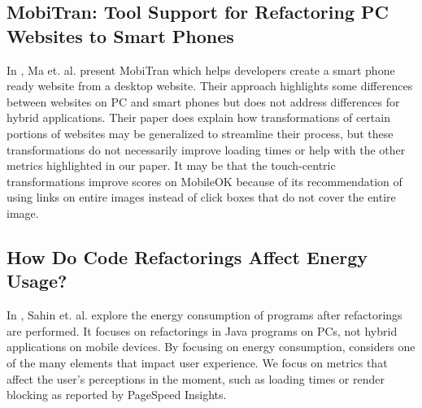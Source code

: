 \documentclass{acm_proc_article-sp}
\begin{document}
\subsection{MobiTran: Tool Support for Refactoring PC Websites to Smart Phones \cite{Ma:2013:MTS:2541614.2541621}}
In \cite{Ma:2013:MTS:2541614.2541621}, Ma et. al. present MobiTran which helps developers create a smart phone ready website from a desktop website. 
Their approach highlights some differences between websites on PC and smart phones but does not address differences for hybrid applications. 
Their paper does explain how transformations of certain portions of websites may be generalized to streamline their process, but these transformations do not necessarily improve loading times or help with the other metrics highlighted in our paper. 
It may be that the touch-centric transformations improve scores on MobileOK because of its recommendation of using links on entire images instead of click boxes that do not cover the entire image.

\subsection{How Do Code Refactorings Affect Energy Usage? \cite{Sahin:2014:CRA:2652524.2652538}}
In \cite{Sahin:2014:CRA:2652524.2652538}, Sahin et. al. explore the energy consumption of programs after refactorings are performed. 
It focuses on refactorings in Java programs on PCs, not hybrid applications on mobile devices. 
By focusing on energy consumption, \cite{Sahin:2014:CRA:2652524.2652538} considers one of the many elements that impact user experience. 
We focus on metrics that affect the user's perceptions in the moment, such as loading times or render blocking as reported by PageSpeed Insights.
\end{document}
